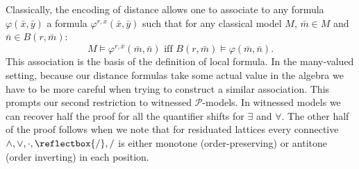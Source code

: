 \documentclass{lmcs} %
\newcommand{\?}{\ensuremath{\mkern0.4\thinmuskip}}
\newcommand{\und}{\mathord{\reflectbox{/}}}%
\let\phi=\varphi
\newcommand{\CP}{\mathcal{P}}
\begin{document}
Classically, the encoding of distance allows one to associate to any formula $\phi(\bar{x},\bar{y})$ a formula $\phi^{r,\bar{x}}(\bar{x},\bar{y})$ such that for any classical model $M$, $\bar{m}\in M$ and $\bar{n}\in B(r,\bar{m})$: \[M\models\phi^{r,\bar{x}}(\bar{m},\bar{n}) \text{ iff } B(r,\bar{m})\models\phi(\bar{m},\bar{n}).\] 
This association is the basis of the definition of local formula. In the many-valued setting, because our distance formulas take some actual value in the algebra we have to be more careful when trying to construct a similar association. This prompts our second restriction to witnessed $\CP$-models. In witnessed models we can recover half the proof for all the quantifier shifts for $\exists$ and $\forall$. The other half of the proof follows when we note that for residuated lattices every connective $\land,\lor,\cdot,\und,/$ is either monotone (order-preserving) or antitone (order inverting) in each position. 
\end{document}
